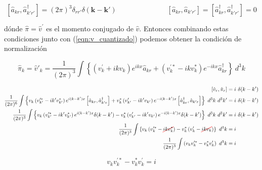 \begin{equation}
    \left[ \hat{a}_{kr}, \hat{a}^\dagger_{k'r'} \right] = (2 \pi)^3 \delta_{rr'} \delta \left( \textbf{k} - \textbf{k}' \right) \hspace{3cm} \left[ \hat{a}_{kr}, \hat{a}_{k'r'} \right] = \left[ \hat{a}^\dagger_{kr}, \hat{a}^\dagger_{k'r'} \right] = 0
\end{equation}

\noindent
dónde $\hat{\pi} = \hat{v}^\prime$ es el momento conjugado de $\hat{v}$. Entonces combinando estas condiciones junto con (\ref{eqn:v_cuantizado}) podemos obtener la condición de normalización

\begin{equation*}
    \hat{\pi}_k = \hat{v}'_k = \frac{1}{(2\pi)^3} \int \left\{ \left(v^\prime_k + i k v_k \right) e^{i k x} \hat{a}_{kr} + \left( v_k^{\prime *} - i k v^*_k \right) e^{- i k x} \hat{a}_{kr}^\dagger \right\} \ d^3 k
\end{equation*}

\begin{equation*}
    \begin{split}
        \left[ \hat{v}_{r}, \hat{\pi}_r \right] &= i \ \delta(k - k')\\
        \frac{1}{(2 \pi)^6} \int \left\{ v_k \left( v^{\prime *}_{k'} - i k' v_{k'}^{*} \right) e^{i (k - k') x} \left[ \hat{a}_{kr}, \hat{a}^\dagger_{k'r} \right] + v^*_k \left( v^{\prime}_{k'} - i k' v_{k'} \right) e^{-i (k - k') x} \left[ \hat{a}^{\dagger}_{kr}, \hat{a}_{k'r} \right] \right\} \ d^3 k \ d^3 k^\prime &= i \ \delta (k - k')\\
        \frac{1}{(2 \pi)^3} \int \left\{ v_k \left( v^{\prime *}_{k'} - i k' v_{k'}^{*} \right) e^{i (k - k') x} \delta (k - k') - v^*_k \left( v^{\prime}_{k'} - i k' v_{k'} \right) e^{-i (k - k') x} \delta (k - k') \right\} \ d^3 k \ d^3 k^\prime &= i \ \delta (k - k')\\
        \frac{1}{(2 \pi)^3} \int \left\{ v_k \left( v^{\prime *}_{k} - \colorcancel{red}{i k v_{k}^{*}} \right) - v^*_k \left( v^{\prime}_{k} - \colorcancel{red}{i k v_{k}} \right) \right\} \ d^3 k &= i\\
        \frac{1}{(2 \pi)^3} \int \left( v_k v_k^{\prime *} - v_k^* v_k^\prime \right) \ d^3 k &= i
    \end{split}
\end{equation*}

\begin{equation}
    v_k v^{\prime *}_k - v_k^* v_k^\prime = i
\end{equation}


